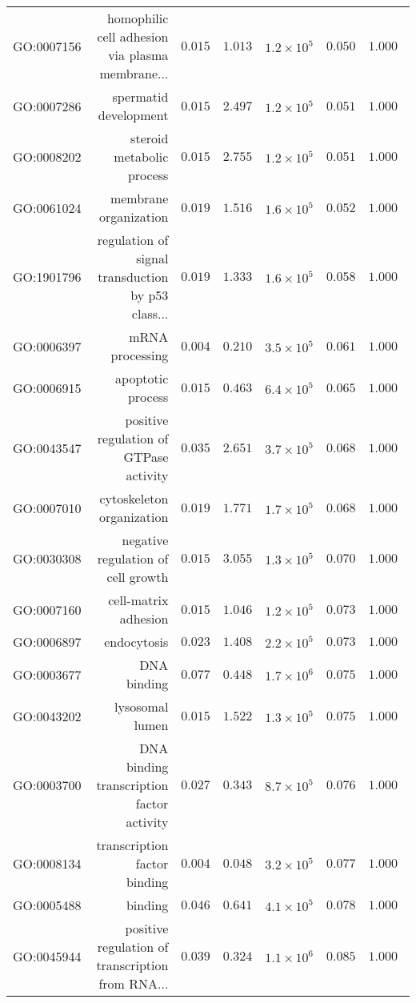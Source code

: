 \documentclass{article}
\begin{document}
\begin{longtable}{|l|r|r|r|r|r|r|}
GO:0007156 & homophilic cell adhesion via plasma membrane... & $ 0.015$ & $ 1.013$ & $1.2\times 10^{5}$ & $ 0.050$ & $ 1.000~~$ \\
GO:0007286 & spermatid development & $ 0.015$ & $ 2.497$ & $1.2\times 10^{5}$ & $ 0.051$ & $ 1.000~~$ \\
GO:0008202 & steroid metabolic process & $ 0.015$ & $ 2.755$ & $1.2\times 10^{5}$ & $ 0.051$ & $ 1.000~~$ \\
GO:0061024 & membrane organization & $ 0.019$ & $ 1.516$ & $1.6\times 10^{5}$ & $ 0.052$ & $ 1.000~~$ \\
GO:1901796 & regulation of signal transduction by p53 class... & $ 0.019$ & $ 1.333$ & $1.6\times 10^{5}$ & $ 0.058$ & $ 1.000~~$ \\
GO:0006397 & mRNA processing & $ 0.004$ & $ 0.210$ & $3.5\times 10^{5}$ & $ 0.061$ & $ 1.000~~$ \\
GO:0006915 & apoptotic process & $ 0.015$ & $ 0.463$ & $6.4\times 10^{5}$ & $ 0.065$ & $ 1.000~~$ \\
GO:0043547 & positive regulation of GTPase activity & $ 0.035$ & $ 2.651$ & $3.7\times 10^{5}$ & $ 0.068$ & $ 1.000~~$ \\
GO:0007010 & cytoskeleton organization & $ 0.019$ & $ 1.771$ & $1.7\times 10^{5}$ & $ 0.068$ & $ 1.000~~$ \\
GO:0030308 & negative regulation of cell growth & $ 0.015$ & $ 3.055$ & $1.3\times 10^{5}$ & $ 0.070$ & $ 1.000~~$ \\
GO:0007160 & cell-matrix adhesion & $ 0.015$ & $ 1.046$ & $1.2\times 10^{5}$ & $ 0.073$ & $ 1.000~~$ \\
GO:0006897 & endocytosis & $ 0.023$ & $ 1.408$ & $2.2\times 10^{5}$ & $ 0.073$ & $ 1.000~~$ \\
GO:0003677 & DNA binding & $ 0.077$ & $ 0.448$ & $1.7\times 10^{6}$ & $ 0.075$ & $ 1.000~~$ \\
GO:0043202 & lysosomal lumen & $ 0.015$ & $ 1.522$ & $1.3\times 10^{5}$ & $ 0.075$ & $ 1.000~~$ \\
GO:0003700 & DNA binding transcription factor activity & $ 0.027$ & $ 0.343$ & $8.7\times 10^{5}$ & $ 0.076$ & $ 1.000~~$ \\
GO:0008134 & transcription factor binding & $ 0.004$ & $ 0.048$ & $3.2\times 10^{5}$ & $ 0.077$ & $ 1.000~~$ \\
GO:0005488 & binding & $ 0.046$ & $ 0.641$ & $4.1\times 10^{5}$ & $ 0.078$ & $ 1.000~~$ \\
GO:0045944 & positive regulation of transcription from RNA... & $ 0.039$ & $ 0.324$ & $1.1\times 10^{6}$ & $ 0.085$ & $ 1.000~~$ \\

\end{longtable}
\end{document}
